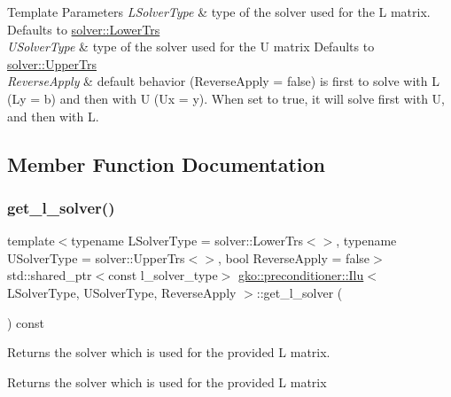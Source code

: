 \begin{DoxyTemplParams}{Template Parameters}
{\em L\+Solver\+Type} & type of the solver used for the L matrix. Defaults to \hyperlink{classgko_1_1solver_1_1LowerTrs}{solver\+::\+Lower\+Trs} \\
\hline
{\em U\+Solver\+Type} & type of the solver used for the U matrix Defaults to \hyperlink{classgko_1_1solver_1_1UpperTrs}{solver\+::\+Upper\+Trs} \\
\hline
{\em Reverse\+Apply} & default behavior (Reverse\+Apply = false) is first to solve with L (Ly = b) and then with U (Ux = y). When set to true, it will solve first with U, and then with L. \\
\hline
\end{DoxyTemplParams}


\subsection{Member Function Documentation}
\mbox{\label{classgko_1_1preconditioner_1_1Ilu_aa5a2eb4335618ea11a65b735b058afb1}} 
\subsubsection{\texorpdfstring{get\+\_\+l\+\_\+solver()}{get\_l\_solver()}}
{\footnotesize\ttfamily template$<$typename L\+Solver\+Type  = solver\+::\+Lower\+Trs$<$$>$, typename U\+Solver\+Type  = solver\+::\+Upper\+Trs$<$$>$, bool Reverse\+Apply = false$>$ \\
std\+::shared\+\_\+ptr$<$const l\+\_\+solver\+\_\+type$>$ \hyperlink{classgko_1_1preconditioner_1_1Ilu}{gko\+::preconditioner\+::\+Ilu}$<$ L\+Solver\+Type, U\+Solver\+Type, Reverse\+Apply $>$\+::get\+\_\+l\+\_\+solver (\begin{DoxyParamCaption}{ }\end{DoxyParamCaption}) const\hspace{0.3cm}{\ttfamily [inline]}}



Returns the solver which is used for the provided L matrix. 

\begin{DoxyReturn}{Returns}
the solver which is used for the provided L matrix 
\end{DoxyReturn}
\mbox{\label{classgko_1_1preconditioner_1_1Ilu_a8dd037ae6495721bb74aa4ecd1d5d564}} 
